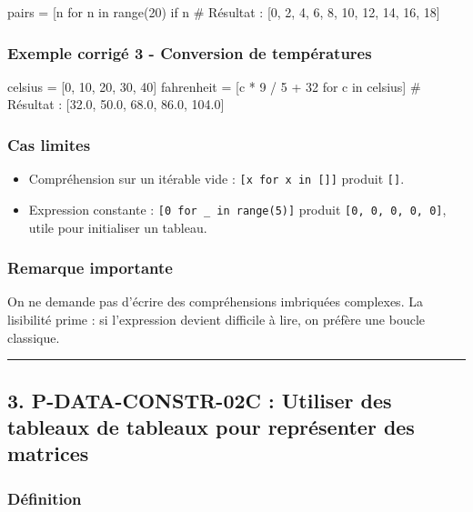 \begin{python}
pairs = [n for n in range(20) if n %
# Résultat : [0, 2, 4, 6, 8, 10, 12, 14, 16, 18]
\end{python}

\subsubsection{Exemple corrigé 3 - Conversion de températures}

\begin{python}
celsius = [0, 10, 20, 30, 40]
fahrenheit = [c * 9 / 5 + 32 for c in celsius]
# Résultat : [32.0, 50.0, 68.0, 86.0, 104.0]
\end{python}

\subsubsection{Cas limites}

\begin{itemize}
\tightlist
\item
  Compréhension sur un itérable vide :
  \texttt{{[}x\ for\ x\ in\ {[}{]}{]}} produit \texttt{{[}{]}}.
\item
  Expression constante : \texttt{{[}0\ for\ \_\ in\ range(5){]}} produit
  \texttt{{[}0,\ 0,\ 0,\ 0,\ 0{]}}, utile pour initialiser un tableau.
\end{itemize}

\subsubsection{Remarque importante}

On ne demande pas d'écrire des compréhensions imbriquées complexes. La
lisibilité prime : si l'expression devient difficile à lire, on préfère
une boucle classique.

\begin{center}\rule{0.5\linewidth}{0.5pt}\end{center}

\subsection{3. P-DATA-CONSTR-02C : Utiliser des tableaux de tableaux pour représenter des matrices}

\subsubsection{Définition}

